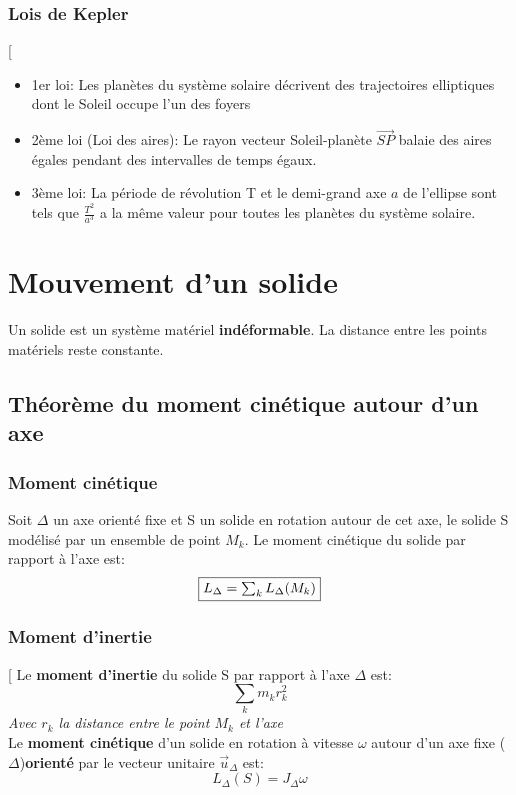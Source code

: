\documentclass[12pt,hidelinks]{article}
\begin{document}
        \subsubsection{Lois de Kepler}
            \begin{DashedDefinition}{}[
                \begin{itemize}
                    \item 1er loi: Les planètes du système solaire décrivent des trajectoires elliptiques dont le Soleil occupe l'un des foyers
                    \item 2ème loi (Loi des aires): Le rayon vecteur Soleil-planète $\overrightarrow{SP}$ balaie des aires égales pendant des intervalles de temps égaux.
                    \item 3ème loi: La période de révolution T et le demi-grand axe $a$ de l'ellipse sont tels que $\frac{T^2}{a^3}$ a la même valeur pour toutes les planètes du système solaire.
                \end{itemize}
            \end{DashedDefinition}
\newpage
\section{Mouvement d'un solide}
\vspace{3cm}
    Un solide est un système matériel \textbf{indéformable}. La distance entre les points matériels reste constante.
    \subsection{Théorème du moment cinétique autour d'un axe}
        \subsubsection{Moment cinétique}
            Soit $\Delta$ un axe orienté fixe et S un solide en rotation autour de cet axe, le solide S modélisé par un ensemble de point $M_k$. Le moment cinétique du solide par rapport à l'axe est:
            \[\fbox{$L_\Delta = \sum_k L_\Delta(M_k)$}\]
        \subsubsection{Moment d'inertie}
            \begin{DashedDefinition}{}[
                Le \textbf{moment d'inertie} du solide S par rapport à l'axe $\Delta$ est:
                \[\sum_k m_k r_k^2\]
                \textit{Avec $r_k$ la distance entre le point $M_k$ et l'axe} \\
                Le \textbf{moment cinétique} d'un solide en rotation à vitesse $\omega$ autour d'un axe fixe ($\Delta$)\textbf{orienté} par le vecteur unitaire $\vec u_\Delta$ est:
                \[L_\Delta(S)= J_\Delta \omega\]
            \end{DashedDefinition}
\end{document}

